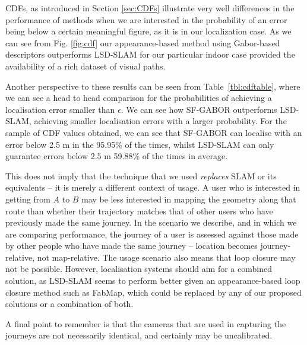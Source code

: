 CDFs, as introduced in Section \ref{sec:CDFs} illustrate very well differences in the performance of methods when we are interested in the probability of an error being below a certain  meaningful figure, as it is in our localization case. As we can see from Fig. \ref{fig:cdf} our appearance-based method using Gabor-based descriptors outperforms LSD-SLAM for our particular indoor case provided the availability of a rich dataset of visual paths. 

Another perspective to these results can be seen from Table~\ref{tbl:cdftable}, where we can see a head to head comparison for the probabilities of achieving a localisation error smaller than $\epsilon$. We can see how SF-GABOR outperforms LSD-SLAM, achieving smaller localisation errors with a larger probability. For the sample of CDF values obtained, we can see that SF-GABOR can localise with an error below 2.5 m in the 95.95\% of the times, whilst LSD-SLAM can only guarantee errors below 2.5 m 59.88\% of the times in average.

This does not imply that the technique that we used {\em replaces} SLAM or its equivalents -- it is merely a different context of usage. A user who is interested in getting from $A$ to $B$ may be less interested in mapping the geometry along that route than whether their trajectory matches that of other users who have previously made the same journey. In the scenario we describe, and in which we are comparing performance, the journey of a user is assessed against those made by other people who have made the same journey -- location becomes journey-relative, not map-relative. The usage scenario also means that loop closure may not be possible. However, localisation systems should aim for a combined solution, as LSD-SLAM seems to perform better given an appearance-based loop closure method \citep{engel14eccv} such as FabMap, which could be replaced by any of our proposed solutions \citep{Rivera-Rubio2015PRL} or a combination of both.

A final point to remember is that the cameras that are used in capturing the journeys are not necessarily identical, and certainly may be uncalibrated.


